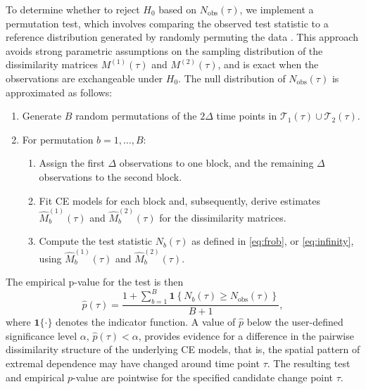 \documentclass[APA,STIX1COL]{WileyNJD-v2}
\begin{document}
To determine whether to reject $H_0$ based on $N_{\mathrm{obs}}(\tau)$, we implement a permutation test, which involves comparing the observed test statistic to a reference distribution generated by randomly permuting the data \citep{Good2004}. This approach avoids strong parametric assumptions on the sampling distribution of the dissimilarity matrices $M^{(1)}(\tau)$ and $M^{(2)}(\tau)$, and is exact when the observations are exchangeable under $H_0$. The null distribution of $N_{\mathrm{obs}}(\tau)$ is approximated as follows:
\begin{enumerate}[label=\arabic*.] 
  \item Generate $B$ random permutations of the $2\Delta$ time points in $\mathcal{T}_1(\tau)\cup\mathcal{T}_2(\tau)$. 
  \item For permutation $b=1,\ldots,B$: 
  \begin{enumerate}
  \item Assign the first $\Delta$ observations to one block, and the remaining $\Delta$ observations to the second block. 
  \item Fit CE models for each block and, subsequently, derive estimates $\widehat{M}^{(1)}_b(\tau)$ and $\widehat{M}_b^{(2)}(\tau)$ for the dissimilarity matrices.
  \item Compute the test statistic $N_b(\tau)$ as defined in \eqref{eq:frob}, or \eqref{eq:infinity}, using $\widehat{M}^{(1)}_b(\tau)$ and $\widehat{M}_b^{(2)}(\tau)$. 
  \end{enumerate}
\end{enumerate}
The empirical p-value for the test is then
\begin{equation} 
\label{eq:perm_pval}
\widehat{p}(\tau) =
\frac{ 1+ \sum_{b=1}^{B} \mathbf{1} \left\{ N_b(\tau) \geq N_{\mathrm{obs}}(\tau) \right\} }{B+1},
\end{equation}
where $\mathbf{1}\{\cdot\}$ denotes the indicator function. A value of $\widehat{p}$ below the user-defined significance level $\alpha$, $\widehat{p}(\tau)<\alpha$, provides evidence for a difference in the pairwise dissimilarity structure of the underlying CE models, that is, the spatial pattern of extremal dependence may have changed around time point $\tau$.  The resulting test and empirical $p$-value are pointwise for the specified candidate change point $\tau$.
\end{document}
